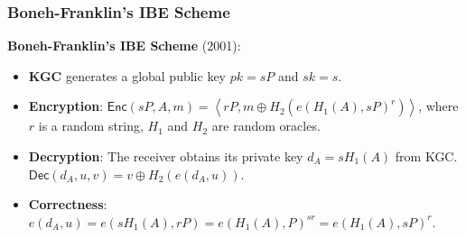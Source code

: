 \begin{frame}\frametitle{Boneh-Franklin's IBE Scheme}
\textbf{Boneh-Franklin's IBE Scheme} (2001):
\begin{itemize}
\item \textbf{KGC} generates a global public key $pk = sP$ and $sk = s$.
\item \textbf{Encryption}: $\mathsf{Enc}(sP, A, m) = \left< rP, m\oplus H_2(e(H_1(A), sP)^r)\right>$, where $r$ is a random string, $H_1$ and $H_2$ are random oracles.
\item \textbf{Decryption}: The receiver obtains its private key $d_{A} = sH_1(A)$ from KGC. 
 $\mathsf{Dec}(d_{A}, u, v) = v \oplus H_2(e(d_A, u)).$ \\
\item \textbf{Correctness}: $e(d_A, u) = e(sH_1(A), rP) = e(H_1(A), P)^{sr} = e(H_1(A), sP)^r$.
\end{itemize}
\end{frame}
